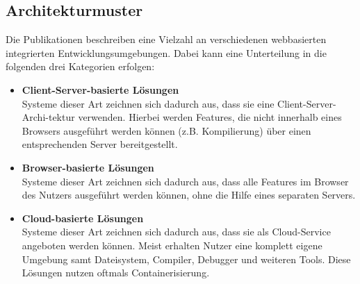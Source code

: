 \subsection{Architekturmuster}\label{section:stand-der-technik:literaturrecherche:architekturmuster}

Die Publikationen beschreiben eine Vielzahl an verschiedenen webbasierten integrierten Entwicklungsumgebungen. Dabei kann eine Unterteilung in die folgenden drei Kategorien erfolgen:

\begin{itemize}
    \item \textbf{Client-Server-basierte Lösungen} \\
          Systeme dieser Art zeichnen sich dadurch aus, dass sie eine Client-Server-Archi-tektur verwenden. Hierbei werden Features, die nicht innerhalb eines Browsers ausgeführt werden können (z.B. Kompilierung) über einen entsprechenden Server bereitgestellt.
    \item \textbf{Browser-basierte Lösungen} \\
          Systeme dieser Art zeichnen sich dadurch aus, dass alle Features im Browser des Nutzers ausgeführt werden können, ohne die Hilfe eines separaten Servers.
    \item \textbf{Cloud-basierte Lösungen} \\
          Systeme dieser Art zeichnen sich dadurch aus, dass sie als Cloud-Service angeboten werden können. Meist erhalten Nutzer eine komplett eigene Umgebung samt Dateisystem, Compiler, Debugger und weiteren Tools. Diese Lösungen nutzen oftmals Containerisierung.
\end{itemize}